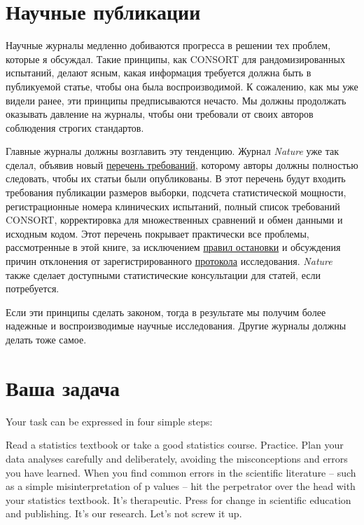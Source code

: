 \section{Научные публикации}
\label{chp12:sciencepublishing}

Научные журналы медленно добиваются прогресса в решении тех проблем, которые я обсуждал. Такие принципы, как CONSORT для рандомизированных испытаний, делают ясным, какая информация требуется должна быть в публикуемой статье, чтобы она была воспроизводимой. К сожалению, как мы уже видели ранее, эти принципы предписываются нечасто. Мы должны продолжать оказывать давление на журналы, чтобы они требовали от своих авторов соблюдения строгих стандартов.

Главные журналы должны возглавить эту тенденцию. Журнал \emph{Nature} уже так сделал, объявив новый \href{http://www.nature.com/authors/policies/checklist.pdf}{перечень требований}, которому авторы должны полностью следовать, чтобы их статьи были опубликованы. В этот перечень будут входить требования публикации размеров выборки, подсчета статистической мощности, регистрационные номера клинических испытаний, полный список требований CONSORT, корректировка для множественных сравнений и обмен данными и исходным кодом. Этот перечень покрывает практически все проблемы, рассмотренные в этой книге, за исключением \hyperref[chp7]{правил остановки} и обсуждения причин отклонения от зарегистрированного \hyperref[chp8]{протокола} исследования. \emph{Nature} также сделает доступными статистические консультации для статей, если потребуется. 

Если эти принципы сделать законом, тогда в результате мы получим более надежные и воспроизводимые научные исследования. Другие журналы должны делать тоже самое.


\section{Ваша задача}
\label{chp12:yourjob}

Your task can be expressed in four simple steps:

    Read a statistics textbook or take a good statistics course. Practice.
    Plan your data analyses carefully and deliberately, avoiding the misconceptions and errors you have learned.
    When you find common errors in the scientific literature – such as a simple misinterpretation of p values – hit the perpetrator over the head with your statistics textbook. It’s therapeutic.
    Press for change in scientific education and publishing. It’s our research. Let’s not screw it up.


